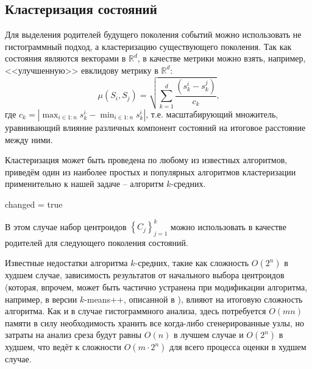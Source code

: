 \documentclass[12pt,twoside,titlepage,сa4paper]{article}
\newcommand{\R}{\ensuremath{\mathbb{R}}}
\begin{document}
	\subsection{Кластеризация состояний}
	\par Для выделения родителей будущего поколения событий можно использовать не гистограммный подход, а кластеризацию существующего поколения. Так как состояния являются векторами в $\R^d$, в качестве метрики можно взять, например, <<улучшенную>> евклидову метрику в $\R^d$:
	\[\mu\left(S_i,S_j\right) = \sqrt{\sum_{k=1}^d\frac{\left(s^i_k-s^j_k\right)}{c_k}} \text{,} \] 
	где $c_k = \left\vert\max_{i\in 1:n} s^i_k - \min_{i\in 1:n} s^i_k\right\vert$, т.е. масштабирующий множитель, уравнивающий влияние различных компонент состояний на итоговое расстояние между ними.
	\par Кластеризация может быть проведена по любому из известных алгоритмов, приведём один из наиболее простых и популярных алгоритмов кластеризации применительно к нашей задаче -- алгоритм $k$-средних.
	\begin{algorithm}
		\DontPrintSemicolon
		changed = true\;
	\end{algorithm}
	\par В этом случае набор центроидов $\left\lbrace C_j\right\rbrace_{j=1}^k$ можно использовать в качестве родителей для следующего поколения состояний.
	\par Известные недостатки алгоритма $k$-средних, такие как сложность $O\left(2^n\right)$ в худшем случае, зависимость результатов от начального выбора центроидов (которая, впрочем, может быть частично устранена при модификации алгоритма, например, в версии $k$-means++, описанной в \cite{Arthur2007}), влияют на итоговую сложность алгоритма. Как и в случае гистограммного анализа, здесь потребуется $O\left(mn\right)$ памяти в силу необходимость хранить все когда-либо сгенерированные узлы, но затраты на анализ среза будут равны $O\left(n\right)$ в лучшем случае и $O\left(2^n\right)$ в худшем, что ведёт к сложности $O\left(m\cdot 2^n\right)$ для всего процесса оценки в худшем случае.
\end{document}
